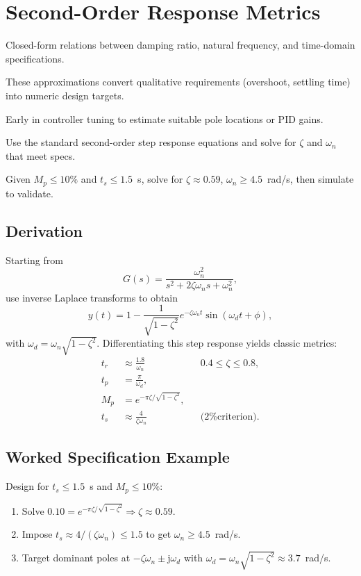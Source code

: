 \section{Second-Order Response Metrics}
\begin{beginnerguide}
    \item[\textbf{What?}] Closed-form relations between damping ratio, natural frequency, and time-domain specifications.
    \item[\textbf{Why?}] These approximations convert qualitative requirements (overshoot, settling time) into numeric design targets.
    \item[\textbf{When?}] Early in controller tuning to estimate suitable pole locations or PID gains.
    \item[\textbf{How?}] Use the standard second-order step response equations and solve for $\zeta$ and $\omega_n$ that meet specs.
    \item[\textbf{Example}] Given $M_p \le 10\%$ and $t_s \le 1.5$~s, solve for $\zeta \approx 0.59$, $\omega_n \ge 4.5$~rad/s, then simulate to validate.
\end{beginnerguide}
\subsection{Derivation}
Starting from
\[
    G(s) = \frac{\omega_n^2}{s^2 + 2 \zeta \omega_n s + \omega_n^2},
\]
use inverse Laplace transforms to obtain
\[
    y(t) = 1 - \frac{1}{\sqrt{1 - \zeta^2}} e^{-\zeta \omega_n t} \sin(\omega_d t + \phi),
\]
with $\omega_d = \omega_n \sqrt{1 - \zeta^2}$. Differentiating this step response yields classic metrics:
\begin{align*}
    t_r &\approx \frac{1.8}{\omega_n} && 0.4 \leq \zeta \leq 0.8,\\
    t_p &= \frac{\pi}{\omega_d},\\
    M_p &= e^{-\pi \zeta / \sqrt{1 - \zeta^2}},\\
    t_s &\approx \frac{4}{\zeta \omega_n} && \text{(2\% criterion)}.
\end{align*}

\subsection{Worked Specification Example}
Design for $t_s \leq 1.5$~s and $M_p \leq 10\%$:
\begin{enumerate}[leftmargin=*]
    \item Solve $0.10 = e^{-\pi \zeta/\sqrt{1-\zeta^2}} \Rightarrow \zeta \approx 0.59$.
    \item Impose $t_s \approx 4/(\zeta \omega_n) \leq 1.5$ to get $\omega_n \geq 4.5$~rad/s.
    \item Target dominant poles at $-\zeta \omega_n \pm \mathrm{j} \omega_d$ with $\omega_d = \omega_n \sqrt{1-\zeta^2} \approx 3.7$~rad/s.
\end{enumerate}

